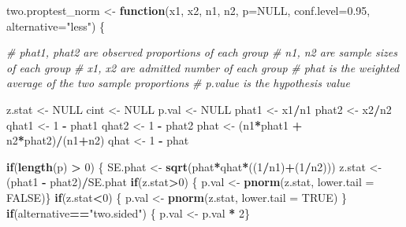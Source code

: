 \documentclass[]{article}
\newenvironment{Shaded}{\begin{snugshade}}{\end{snugshade}}
\newcommand{\KeywordTok}[1]{\textcolor[rgb]{0.13,0.29,0.53}{\textbf{#1}}}
\newcommand{\DataTypeTok}[1]{\textcolor[rgb]{0.13,0.29,0.53}{#1}}
\newcommand{\DecValTok}[1]{\textcolor[rgb]{0.00,0.00,0.81}{#1}}
\newcommand{\FloatTok}[1]{\textcolor[rgb]{0.00,0.00,0.81}{#1}}
\newcommand{\StringTok}[1]{\textcolor[rgb]{0.31,0.60,0.02}{#1}}
\newcommand{\CommentTok}[1]{\textcolor[rgb]{0.56,0.35,0.01}{\textit{#1}}}
\newcommand{\OtherTok}[1]{\textcolor[rgb]{0.56,0.35,0.01}{#1}}
\newcommand{\ControlFlowTok}[1]{\textcolor[rgb]{0.13,0.29,0.53}{\textbf{#1}}}
\newcommand{\OperatorTok}[1]{\textcolor[rgb]{0.81,0.36,0.00}{\textbf{#1}}}
\newcommand{\NormalTok}[1]{#1}
\begin{document}
\begin{Shaded}
\begin{Highlighting}[]
\NormalTok{two.proptest_norm <-}\StringTok{ }\ControlFlowTok{function}\NormalTok{(x1, x2, n1, n2, }\DataTypeTok{p=}\OtherTok{NULL}\NormalTok{, }\DataTypeTok{conf.level=}\FloatTok{0.95}\NormalTok{, }\DataTypeTok{alternative=}\StringTok{"less"}\NormalTok{) \{}

\CommentTok{# phat1, phat2 are observed proportions of each group}
\CommentTok{# n1, n2 are sample sizes of each group}
\CommentTok{# x1, x2 are admitted number of each group}
\CommentTok{# phat is the weighted average of the two sample proportions}
\CommentTok{# p.value is the hypothesis value}
  
\NormalTok{  z.stat <-}\StringTok{ }\OtherTok{NULL}
\NormalTok{  cint <-}\StringTok{ }\OtherTok{NULL}
\NormalTok{  p.val <-}\StringTok{ }\OtherTok{NULL}
\NormalTok{  phat1 <-}\StringTok{ }\NormalTok{x1}\OperatorTok{/}\NormalTok{n1}
\NormalTok{  phat2 <-}\StringTok{ }\NormalTok{x2}\OperatorTok{/}\NormalTok{n2}
\NormalTok{  qhat1 <-}\StringTok{ }\DecValTok{1} \OperatorTok{-}\StringTok{ }\NormalTok{phat1}
\NormalTok{  qhat2 <-}\StringTok{ }\DecValTok{1} \OperatorTok{-}\StringTok{ }\NormalTok{phat2}
\NormalTok{  phat <-}\StringTok{ }\NormalTok{(n1}\OperatorTok{*}\NormalTok{phat1 }\OperatorTok{+}\StringTok{ }\NormalTok{n2}\OperatorTok{*}\NormalTok{phat2)}\OperatorTok{/}\NormalTok{(n1}\OperatorTok{+}\NormalTok{n2)}
\NormalTok{  qhat <-}\StringTok{ }\DecValTok{1} \OperatorTok{-}\StringTok{ }\NormalTok{phat}
  
 
  \ControlFlowTok{if}\NormalTok{(}\KeywordTok{length}\NormalTok{(p) }\OperatorTok{>}\StringTok{ }\DecValTok{0}\NormalTok{) \{ }
\NormalTok{    SE.phat <-}\StringTok{ }\KeywordTok{sqrt}\NormalTok{(phat}\OperatorTok{*}\NormalTok{qhat}\OperatorTok{*}\NormalTok{((}\DecValTok{1}\OperatorTok{/}\NormalTok{n1)}\OperatorTok{+}\NormalTok{(}\DecValTok{1}\OperatorTok{/}\NormalTok{n2))) }
\NormalTok{    z.stat <-}\StringTok{ }\NormalTok{(phat1 }\OperatorTok{-}\StringTok{ }\NormalTok{phat2)}\OperatorTok{/}\NormalTok{SE.phat}
    \ControlFlowTok{if}\NormalTok{(z.stat}\OperatorTok{>}\DecValTok{0}\NormalTok{) \{}
\NormalTok{      p.val <-}\StringTok{ }\KeywordTok{pnorm}\NormalTok{(z.stat, }\DataTypeTok{lower.tail =} \OtherTok{FALSE}\NormalTok{)\}}
    \ControlFlowTok{if}\NormalTok{(z.stat}\OperatorTok{<}\DecValTok{0}\NormalTok{) \{}
\NormalTok{      p.val <-}\StringTok{ }\KeywordTok{pnorm}\NormalTok{(z.stat, }\DataTypeTok{lower.tail =} \OtherTok{TRUE}\NormalTok{)}
\NormalTok{    \}}
      \ControlFlowTok{if}\NormalTok{(alternative}\OperatorTok{==}\StringTok{"two.sided"}\NormalTok{) \{}
\NormalTok{        p.val <-}\StringTok{ }\NormalTok{p.val }\OperatorTok{*}\StringTok{ }\DecValTok{2}\NormalTok{\}}
    

\end{Highlighting}
\end{Shaded}
\end{document}
